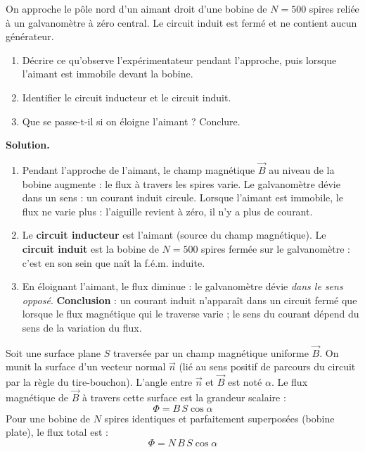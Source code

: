 \documentclass[11pt]{article}
\newcommand{\cle}[1]{{\popxbold\color{popdark}#1}}
\newcounter{popsec}
\newcounter{popsub}
\newcommand{\courssub}[1]{%
  \stepcounter{popsub}%
  \par\vspace{9pt}\noindent{\popxbold\fontsize{11.5}{13}\selectfont\color{popink}{\color{poporange}\thepopsec.\thepopsub}\hspace{6pt}#1}\par\nopagebreak\vspace{4pt}
}
\begin{document}
\begin{exoresolu}
On approche le pôle nord d'un aimant droit d'une bobine de $N = 500$ spires reliée à un galvanomètre à zéro central. Le circuit induit est fermé et ne contient aucun générateur.
\begin{enumerate}
\item Décrire ce qu'observe l'expérimentateur pendant l'approche, puis lorsque l'aimant est immobile devant la bobine.
\item Identifier le circuit inducteur et le circuit induit.
\item Que se passe-t-il si on éloigne l'aimant ? Conclure.
\end{enumerate}
\tcblower
\textbf{Solution.}
\begin{enumerate}
\item Pendant l'approche de l'aimant, le champ magnétique $\vec{B}$ au niveau de la bobine augmente : le flux à travers les spires varie. Le galvanomètre dévie dans un sens : un \cle{courant induit} circule. Lorsque l'aimant est immobile, le flux ne varie plus : l'aiguille revient à zéro, il n'y a plus de courant.
\item Le \textbf{circuit inducteur} est l'aimant (source du champ magnétique). Le \textbf{circuit induit} est la bobine de $N = 500$ spires fermée sur le galvanomètre : c'est en son sein que naît la f.é.m. induite.
\item En éloignant l'aimant, le flux diminue : le galvanomètre dévie \emph{dans le sens opposé}. \textbf{Conclusion} : un courant induit n'apparaît dans un circuit fermé que lorsque le flux magnétique qui le traverse varie ; le sens du courant dépend du sens de la variation du flux.
\end{enumerate}
\end{exoresolu}

\courssub{Flux magnétique}

\begin{definition}
Soit une surface plane $S$ traversée par un champ magnétique \cle{uniforme} $\vec{B}$. On munit la surface d'un vecteur normal $\vec{n}$ (lié au sens positif de parcours du circuit par la règle du tire-bouchon). L'angle entre $\vec{n}$ et $\vec{B}$ est noté $\alpha$.
Le \cle{flux magnétique} de $\vec{B}$ à travers cette surface est la grandeur scalaire :
\[ \Phi = B\,S\cos\alpha \]
Pour une bobine de $N$ spires identiques et parfaitement superposées (bobine plate), le flux total est :
\[ \Phi = N\,B\,S\cos\alpha \]
\end{definition}
\end{document}
